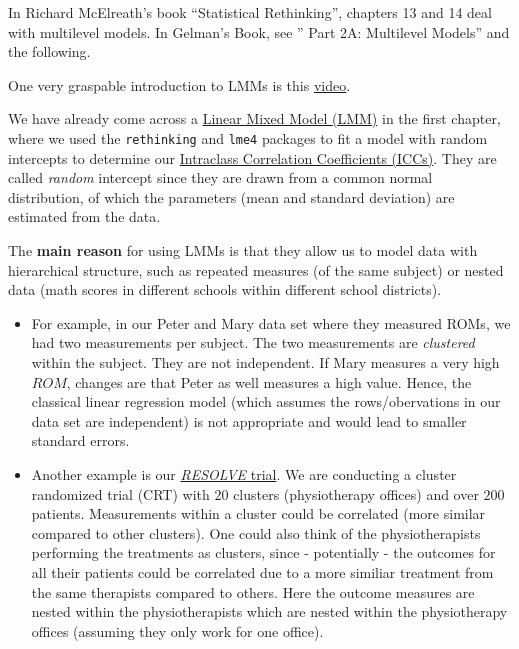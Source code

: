 \documentclass[
]{book}
\begin{document}
In Richard McElreath's book ``Statistical Rethinking'',
chapters 13 and 14 deal with multilevel models.
In Gelman's Book, see '' Part 2A: Multilevel Models'' and the following.

One very graspable introduction to LMMs is this
\href{https://www.youtube.com/watch?v=QCqF-2E86r0&ab_channel=MatthewE.Clapham}{video}.

We have already come across a \href{https://en.wikipedia.org/wiki/Mixed_model}{Linear Mixed Model (LMM)}
in the first chapter, where we used the \texttt{rethinking} and \texttt{lme4} packages to fit a model with
random intercepts to determine our
\href{https://jdegenfellner.github.io/Script_QM3_ZHAW/reliability-and-validity.html\#ICC}{Intraclass Correlation Coefficients (ICCs)}.
They are called \emph{random} intercept since they are drawn from a common normal distribution,
of which the parameters (mean and standard deviation) are estimated from the data.

The \textbf{main reason} for using LMMs is that they allow us to model data
with hierarchical structure, such as repeated measures (of the same subject)
or nested data (math scores in different schools within different school districts).

\begin{itemize}
\item
  For example, in our Peter and Mary data set where they measured
  ROMs, we had two measurements per subject. The two measurements
  are \emph{clustered} within the subject.
  They are not independent. If Mary measures a very high \(ROM\), changes are that
  Peter as well measures a high value. Hence, the classical linear regression
  model (which assumes the rows/obervations in our data set are independent)
  is not appropriate and would lead to smaller standard errors.
\item
  Another example is our \href{https://www.zhaw.ch/en/research/project/74535}{\emph{RESOLVE} trial}.
  We are conducting a
  cluster randomized trial (CRT) with \(20\) clusters (physiotherapy offices)
  and over \(200\) patients. Measurements within a cluster
  could be correlated (more similar compared to other clusters).
  One could also think of the physiotherapists performing
  the treatments as clusters, since - potentially - the outcomes
  for all their patients could be correlated due to a more similiar
  treatment from the same therapists compared to others.
  Here the outcome measures are nested within the physiotherapists which
  are nested within the physiotherapy offices
  (assuming they only work for one office).
\end{itemize}
\end{document}
